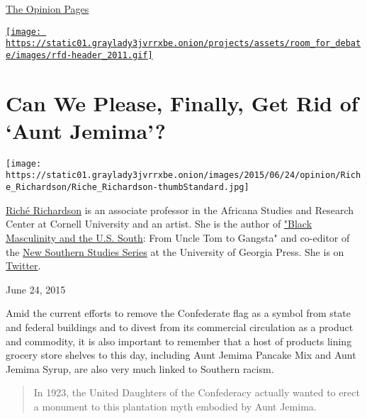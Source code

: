 \subsubsection{}

\href{https://www.nytimes3xbfgragh.onion/pages/opinion/index.html}{The
Opinion Pages}

\href{../../../../../roomfordebate}{\texttt{[image: https://static01.graylady3jvrrxbe.onion/projects/assets/room\_for\_debate/images/rfd-header\_2011.gif]}}

\hypertarget{can-we-please-finally-get-rid-of-aunt-jemima}{%
\section{Can We Please, Finally, Get Rid of `Aunt
Jemima'?}\label{can-we-please-finally-get-rid-of-aunt-jemima}}

\texttt{[image: https://static01.graylady3jvrrxbe.onion/images/2015/06/24/opinion/Riche\_Richardson/Riche\_Richardson-thumbStandard.jpg]}

\href{//www.asrc.cornell.edu/people/richardson.cfm}{Riché Richardson} is
an associate professor in the Africana Studies and Research Center at
Cornell University and an artist. She is the author of
\href{//www.ugapress.org/index.php/books/black_masculinity}{"Black
Masculinity and the U.S. South}: From Uncle Tom to Gangsta" and
co-editor of the \href{//www.ugapress.org/index.php/series/TNSS}{New
Southern Studies Series} at the University of Georgia Press. She is on
\href{https://twitter.com/twindynasty}{Twitter}.

June 24, 2015

Amid the current efforts to remove the Confederate flag as a symbol from
state and federal buildings and to divest from its commercial
circulation as a product and commodity, it is also important to remember
that a host of products lining grocery store shelves to this day,
including Aunt Jemima Pancake Mix and Aunt Jemima Syrup, are also very
much linked to Southern racism.

\begin{quote}
In 1923, the United Daughters of the Confederacy actually wanted to
erect a monument to this plantation myth embodied by Aunt Jemima.
\end{quote}

